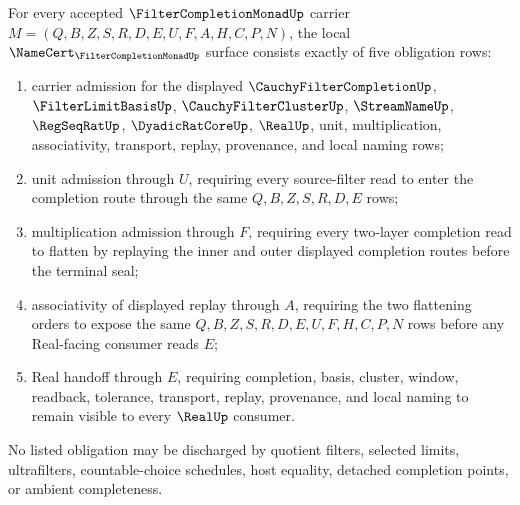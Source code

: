 \begin{theorem}
\label{thm:cauchy-completion-filter-monad-laws}
For every accepted $\FilterCompletionMonadUp$ carrier $M=(Q,B,Z,S,R,D,E,U,F,A,H,C,P,N)$, the local $\NameCert_{\FilterCompletionMonadUp}$ surface consists exactly of five obligation rows:
\begin{enumerate}
\item carrier admission for the displayed $\CauchyFilterCompletionUp$, $\FilterLimitBasisUp$, $\CauchyFilterClusterUp$, $\StreamNameUp$, $\RegSeqRatUp$, $\DyadicRatCoreUp$, $\RealUp$, unit, multiplication, associativity, transport, replay, provenance, and local naming rows;
\item unit admission through $U$, requiring every source-filter read to enter the completion route through the same $Q,B,Z,S,R,D,E$ rows;
\item multiplication admission through $F$, requiring every two-layer completion read to flatten by replaying the inner and outer displayed completion routes before the terminal seal;
\item associativity of displayed replay through $A$, requiring the two flattening orders to expose the same $Q,B,Z,S,R,D,E,U,F,H,C,P,N$ rows before any Real-facing consumer reads $E$;
\item Real handoff through $E$, requiring completion, basis, cluster, window, readback, tolerance, transport, replay, provenance, and local naming to remain visible to every $\RealUp$ consumer.
\end{enumerate}
No listed obligation may be discharged by quotient filters, selected limits, ultrafilters, countable-choice schedules, host equality, detached completion points, or ambient completeness.
\end{theorem}
